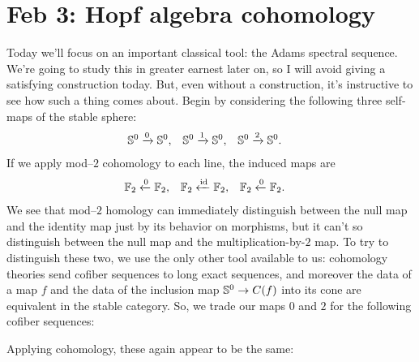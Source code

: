 





\section{Feb 3: Hopf algebra cohomology}

 Today we'll focus on an important classical tool: the Adams spectral sequence.  We're going to study this in greater earnest later on, so I will avoid giving a satisfying construction today.  But, even without a construction, it's instructive to see how such a thing comes about.    Begin by considering the following three self-maps of the stable sphere:
\begin{align*}
\S^0 & \xrightarrow{0} \S^0, & \S^0 & \xrightarrow{1} \S^0, & \S^0 & \xrightarrow{2} \S^0.
\end{align*}
If we apply mod--$2$ cohomology to each line, the induced maps are
\begin{align*}
\F_2 & \xleftarrow{0} \F_2, & \F_2 & \xleftarrow{\id} \F_2, & \F_2 & \xleftarrow{0} \F_2.
\end{align*}
We see that mod--$2$ homology can immediately distinguish between the null map and the identity map just by its behavior on morphisms, but it can't so distinguish between the null map and the multiplication-by-$2$ map.  To try to distinguish these two, we use the only other tool available to us: cohomology theories send cofiber sequences to long exact sequences, and moreover the data of a map $f$ and the data of the inclusion map $\S^0 \to C(f)$ into its cone are equivalent in the stable category.  So, we trade our maps $0$ and $2$ for the following cofiber sequences:
\begin{center}
\end{center}
Applying cohomology, these again appear to be the same:
\begin{center}
\end{center}

